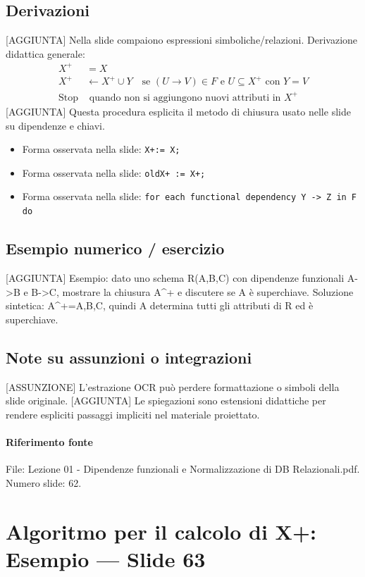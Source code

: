 \documentclass[11pt]{article}
\begin{document}
\subsection*{Derivazioni}
[AGGIUNTA] Nella slide compaiono espressioni simboliche/relazioni. Derivazione didattica generale:
\begin{align*}
X^+ &= X \\
X^+ &\leftarrow X^+ \cup Y \quad \text{se } (U \to V) \in F \text{ e } U \subseteq X^+ \text{ con } Y=V \\
\text{Stop} &\text{ quando non si aggiungono nuovi attributi in } X^+
\end{align*}
[AGGIUNTA] Questa procedura esplicita il metodo di chiusura usato nelle slide su dipendenze e chiavi.
\begin{itemize}[leftmargin=*]
\item Forma osservata nella slide: \texttt{X+:= X;}
\item Forma osservata nella slide: \texttt{oldX+ := X+;}
\item Forma osservata nella slide: \texttt{for each functional dependency Y -> Z in F do}
\end{itemize}
\subsection*{Esempio numerico / esercizio}
[AGGIUNTA] Esempio: dato uno schema R(A,B,C) con dipendenze funzionali A->B e B->C, mostrare la chiusura A^+ e discutere se A è superchiave. Soluzione sintetica: A^+={A,B,C}, quindi A determina tutti gli attributi di R ed è superchiave.
\subsection*{Note su assunzioni o integrazioni}
[ASSUNZIONE] L'estrazione OCR può perdere formattazione o simboli della slide originale.
[AGGIUNTA] Le spiegazioni sono estensioni didattiche per rendere espliciti passaggi impliciti nel materiale proiettato.
\paragraph{Riferimento fonte} File: Lezione 01 - Dipendenze funzionali e Normalizzazione di DB Relazionali.pdf. Numero slide: 62.
\section{Algoritmo per il calcolo di X+: Esempio --- Slide 63}
\end{document}
